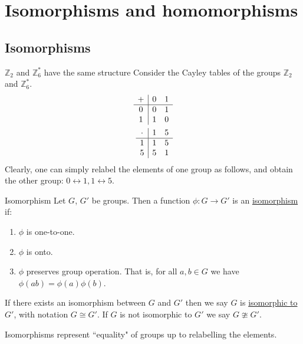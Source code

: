 \documentclass[12pt]{article}
\newcommand{\Z}{\mathbb{Z}}
\begin{document}
	\section{Isomorphisms and homomorphisms}
	\subsection{Isomorphisms}
	\begin{myrem}{$\Z_2$ and $\Z_6^*$ have the same structure}{}
		Consider the Cayley tables of the groups $\Z_2$ and $\Z_6^*$.
		\begin{align*}
			\begin{array}{c | cc}
			+ & 0 & 1\\
			\hline
			0     & 0 & 1 \\
			1     & 1 & 0 \\
			\end{array}\\
			\begin{array}{c | cc}
			\cdot & 1 & 5\\
			\hline
			1     & 1 & 5 \\
			5     & 5 & 1 \\
			\end{array}
		\end{align*}
		Clearly, one can simply relabel the elements of one group as follows, and obtain the other group: $0\leftrightarrow1, 1\leftrightarrow5$.
	\end{myrem}
	
	\begin{mydef}{Isomorphism}{}
		Let $G$, $G'$ be groups. Then a function $\phi:G\to G'$ is an \underline{isomorphism} if:
		\begin{enumerate}
			\item $\phi$ is one-to-one.
			\item $\phi$ is onto.
			\item $\phi$ preserves group operation. That is, for all $a, b\in G$ we have $\phi(ab)=\phi(a)\phi(b)$.
		\end{enumerate}
		
		If there exists an isomorphism between $G$ and $G'$ then we say $G$ is \underline{isomorphic to} $G'$, with notation $G\cong G'$. If $G$ is not isomorphic to $G'$ we say $G\ncong G'$.
	\end{mydef}
	
	\begin{myrem}{}{}
		Isomorphisms represent ``equality" of groups up to relabelling the elements.
	\end{myrem}
	
\end{document}
